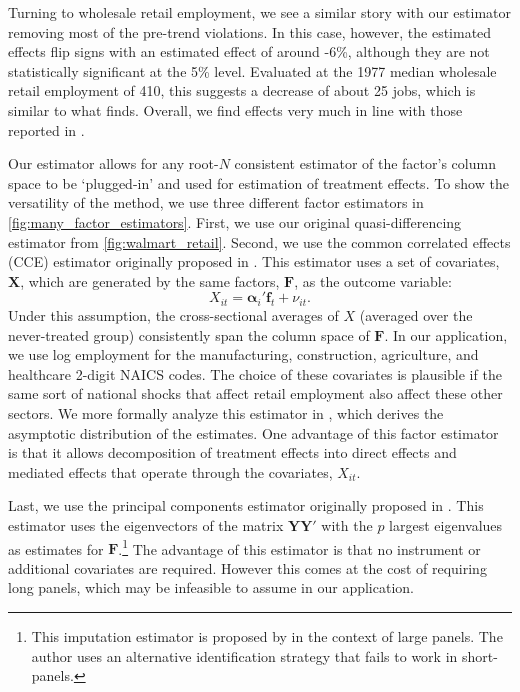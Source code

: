 \documentclass[12pt]{article}
\begin{document}
Turning to wholesale retail employment, we see a similar story with our estimator removing most of the pre-trend violations. In this case, however, the estimated effects flip signs with an estimated effect of around -6\%, although they are not statistically significant at the 5\% level. Evaluated at the 1977 median wholesale retail employment of 410, this suggests a decrease of about 25 jobs, which is similar to what \citet{basker2005job} finds. Overall, we find effects very much in line with those reported in \citet{basker2005job}.

Our estimator allows for any root-$N$ consistent estimator of the factor's column space to be `plugged-in' and used for estimation of treatment effects. To show the versatility of the method, we use three different factor estimators in \autoref{fig:many_factor_estimators}. First, we use our original quasi-differencing estimator from \autoref{fig:walmart_retail}. Second, we use the common correlated effects (CCE) estimator originally proposed in \citet{pesaran2006estimation}. This estimator uses a set of covariates, $\bm X$, which are generated by the same factors, $\bm F$, as the outcome variable:
\begin{equation}
  X_{it} = \bm\alpha_i' \bm f_t + \nu_{it}.
\end{equation}
Under this assumption, the cross-sectional averages of $X$ (averaged over the never-treated group) consistently span the column space of $\bm F$.  In our application, we use log employment for the manufacturing, construction, agriculture, and healthcare 2-digit NAICS codes. The choice of these covariates is plausible if the same sort of national shocks that affect retail employment also affect these other sectors. We more formally analyze this estimator in \citet{Brown_Butts_Westerlund_2023}, which derives the asymptotic distribution of the estimates. One advantage of this factor estimator is that it allows decomposition of treatment effects into direct effects and mediated effects that operate through the covariates, $X_{it}$.

Last, we use the principal components estimator originally proposed in \citet{Bai_2009}. This estimator uses the eigenvectors  of the matrix $\bm Y \bm Y'$ with the $p$ largest eigenvalues as estimates for $\bm F$.\footnote{This imputation estimator is proposed by \citet{Xu_2017} in the context of large panels. The author uses an alternative identification strategy that fails to work in short-panels.} The advantage of this estimator is that no instrument or additional covariates are required. However this comes at the cost of requiring long panels, which may be infeasible to assume in our application.
\end{document}
